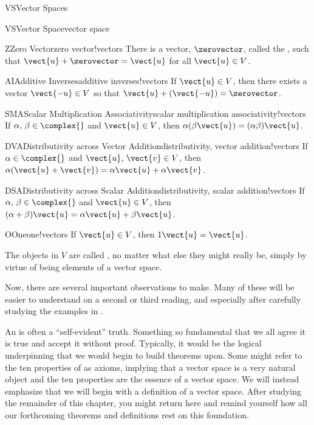 \begin{subsect}{VS}{Vector Spaces}
\begin{definition}{VS}{Vector Space}{vector space}
\begin{para}
\begin{propertylist}
\begin{property}{Z}{Zero Vector}{zero vector!vectors}
There is a vector, $\zerovector$, called the , such that  $\vect{u}+\zerovector=\vect{u}$  for all $\vect{u}\in V$.\end{property}
%
\begin{property}{AI}{Additive Inverses}{additive inverses!vectors}
If $\vect{u}\in V$, then there exists a vector $\vect{-u}\in V$ so that $\vect{u}+ (\vect{-u})=\zerovector$.\end{property}
%
\begin{property}{SMA}{Scalar Multiplication Associativity}{scalar multiplication associativity!vectors}
If $\alpha,\,\beta\in\complex{\null}$ and $\vect{u}\in V$, then $\alpha(\beta\vect{u})=(\alpha\beta)\vect{u}$.\end{property}
%
\begin{property}{DVA}{Distributivity across Vector Addition}{distributivity, vector addition!vectors}
If $\alpha\in\complex{\null}$ and $\vect{u},\,\vect{v}\in V$, then $\alpha(\vect{u}+\vect{v})=\alpha\vect{u}+\alpha\vect{v}$.\end{property}
%
\begin{property}{DSA}{Distributivity across Scalar Addition}{distributivity, scalar addition!vectors}
If $\alpha,\,\beta\in\complex{\null}$ and $\vect{u}\in V$, then
$(\alpha+\beta)\vect{u}=\alpha\vect{u}+\beta\vect{u}$.\end{property}
%
\begin{property}{O}{One}{one!vectors}
If $\vect{u}\in V$, then $1\vect{u}=\vect{u}$.\end{property}
%
\end{propertylist}
\end{para}
%
\begin{para}The objects in $V$ are called , no matter what else they might really be, simply by virtue of being elements of a vector space.\end{para}
\end{definition}
%
\begin{para}Now, there are several important observations to make.  Many of these will be easier to understand on a second or third reading, and especially after carefully studying the examples in .\end{para}
%
\begin{para}An  is often a ``self-evident'' truth.  Something so fundamental that we all agree it is true and accept it without proof.  Typically, it would be the logical underpinning that we would begin to build theorems upon.  Some might refer to the ten properties of  as axioms, implying that a vector space is a very natural object and the ten properties are the essence of a vector space.  We will instead emphasize that we will begin with a definition of a vector space.   After studying the remainder of this chapter, you might return here and remind yourself how all our forthcoming theorems and definitions rest on this foundation.\end{para}

\end{subsect}
